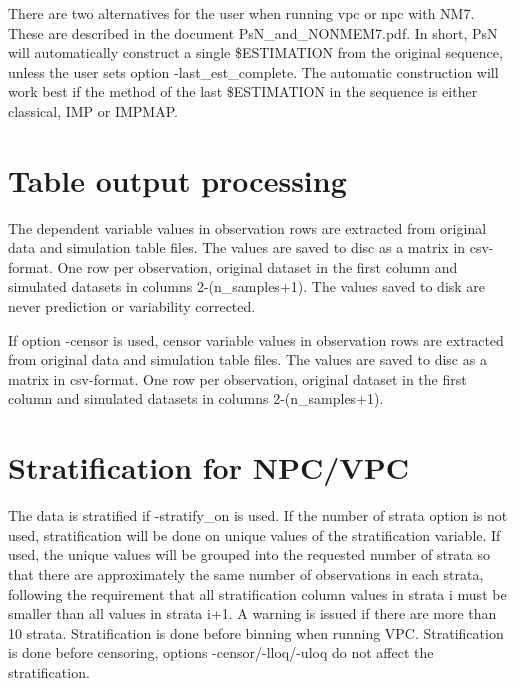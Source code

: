 There are two alternatives for the user when running vpc or npc with NM7. These are described in the document PsN\_and\_NONMEM7.pdf. In short, PsN will automatically construct a single \$ESTIMATION from the original sequence, unless the user sets option -last\_est\_complete. The automatic construction will work best if the method of the last \$ESTIMATION in the sequence is either classical, IMP or IMPMAP.

\section{Table output processing}
The dependent variable values in observation rows are extracted from original data and simulation table files. The values are saved to disc as a matrix in csv-format. One row per observation, original dataset in the first column and simulated datasets in columns 2-(n\_samples+1). The values saved to disk are never prediction or variability corrected.

If option -censor is used, censor variable values in observation rows are extracted from original data and simulation table files. The values are saved to disc as a matrix in csv-format. One row per observation, original dataset in the first column and simulated datasets in columns 2-(n\_samples+1).

\section{Stratification for NPC/VPC}
The data is stratified if -stratify\_on is used. If the number of strata option is not used, stratification will be done on unique values of the stratification variable. If used, the unique values will be grouped into the requested number of strata so that there are approximately the same number of observations in each strata, following the requirement that all stratification column values in strata i must be smaller than all values in strata i+1. A warning is issued if there are more than 10 strata. Stratification is done before binning when running VPC. Stratification is done before censoring, options -censor/-lloq/-uloq do not affect the stratification.

